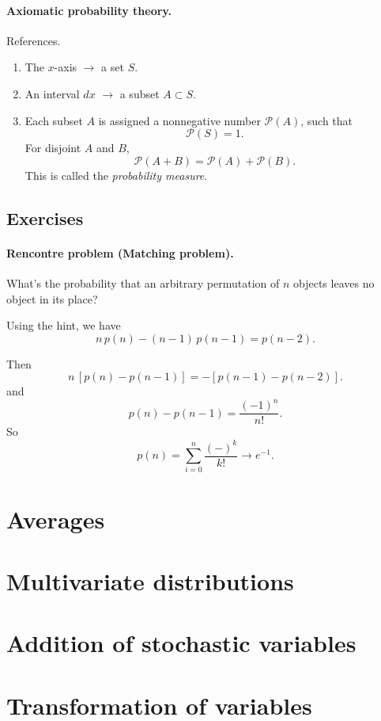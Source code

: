 \documentclass{book}
\theoremstyle{plain}
\theoremstyle{definition}
\theoremstyle{remark}
\begin{document}
\paragraph{Axiomatic probability theory.}

References\cite{kolmogorov}.

\begin{enumerate}
\item The $x$-axis $\rightarrow$ a set $S$.
\item An interval $dx$ $\rightarrow$ a subset $A \subset S$.
\item Each subset $A$ is assigned
  a nonnegative number $\mathcal P(A)$, such that
  $$
  \mathcal P(S) = 1.
  $$
  For disjoint $A$ and $B$,
  $$
  \mathcal P(A + B) = \mathcal P(A) + \mathcal P(B).
  $$
  This is called the \emph{probability measure}.
\end{enumerate}

\subsection*{Exercises}

\paragraph{Rencontre problem (Matching problem).}

What's the probability that an arbitrary permutation
of $n$ objects leaves no object in its place?

Using the hint, we have
$$
n \, p(n) - (n-1) \, p(n-1) = p(n-2).
$$

Then
$$
n \, [p(n) - p(n-1)] = - [ p(n-1) - p(n-2)].
$$
and
$$
p(n) - p(n-1) = \frac{ (-1)^{n} }{n!}.
$$
So
$$
p(n) = \sum_{i = 0}^n \frac{ (-)^{k} } { k! } \rightarrow e^{-1}.
$$


\section{Averages}

\section{Multivariate distributions}

\section{Addition of stochastic variables}

\section{Transformation of variables}
\end{document}
